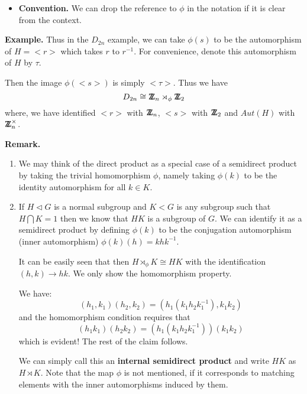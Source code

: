 \documentclass[12pt]{article}
\def\DZ{ \mbox{\rm Z \kern -0.75em Z} }
\begin{document}
\begin{enumerate}
\begin{itemize}
\item {\bf Convention.} We can drop the reference to $\phi$ in the
notation if it is clear from the context.

\end{itemize}

{\bf Example.} Thus in the $D_{2n}$ example,  we can take $\phi(s)$ to
be the automorphism of $H=<r>$ which takes $r$ to $r^{-1}$. For
convenience, denote this automorphism of $H$ by $\tau$.

Then the image $\phi(<s>)$ is simply $<\tau>$.
Thus we have $$D_{2n}\cong \DZ_n\rtimes_{\phi} \DZ_2$$
where, we have identified $<r>$ with $\DZ_n$, $<s>$ with $\DZ_2$
and $Aut(H)$ with $\DZ_n^\times$.


\end{enumerate}

{\bf Remark.}
\begin{enumerate}
\item We may think of the direct product as a special case of a
semidirect product by taking the trivial homomorphism $\phi$, namely
taking $\phi(k)$ to be the identity automorphism for all $k\in K$.

\item If $H\triangleleft G$ is a normal subgroup and $K<G$ is any
subgroup such that $H\bigcap K=1$ then we know that $HK$ is a subgroup
of $G$. We can identify it as a semidirect product by defining $\phi(k)$ 
to be the conjugation automorphism (inner automorphism) $\phi(k)(h)=khk^{-1}$.

It can be easily seen that then $H\rtimes_\phi K \cong HK$ with the
identification $(h,k)\rightarrow hk$. We only show the homomorphism
property.

We have:
$$(h_1,k_1)(h_2,k_2) = (h_1(k_1h_2k_1^{-1}),k_1k_2)$$ and the
homomorphism condition requires that
$$(h_1k_1)(h_2k_2) = (h_1(k_1h_2k_1^{-1}))(k_1k_2)$$
which is evident! The rest of the claim follows.
 
We can simply call this an {\bf internal semidirect product}
 and write $HK$ as $H\rtimes
K$. Note that the map $\phi$ is not mentioned, if it corresponds to 
matching elements with the inner automorphisms induced by them. 


\end{enumerate}
\end{document}
